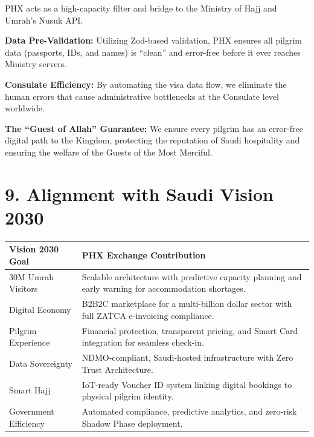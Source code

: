 \documentclass[11pt,a4paper]{article}
\begin{document}
PHX acts as a high-capacity filter and bridge to the Ministry of Hajj and Umrah's Nusuk API.


\vspace{0.3cm}

\textbf{Data Pre-Validation:} Utilizing Zod-based validation, PHX ensures all pilgrim data (passports, IDs, and names) is ``clean'' and error-free before it ever reaches Ministry servers.

\vspace{0.3cm}

\textbf{Consulate Efficiency:} By automating the visa data flow, we eliminate the human errors that cause administrative bottlenecks at the Consulate level worldwide.

\vspace{0.3cm}

\textbf{The ``Guest of Allah'' Guarantee:} We ensure every pilgrim has an error-free digital path to the Kingdom, protecting the reputation of Saudi hospitality and ensuring the welfare of the Guests of the Most Merciful.

\section*{9. Alignment with Saudi Vision 2030}

\begin{center}
\begin{tabular}{|>{\raggedright\arraybackslash}p{4cm}|>{\raggedright\arraybackslash}p{10cm}|}
\hline
\rowcolor{headergray}
\textbf{Vision 2030 Goal} & \textbf{PHX Exchange Contribution} \\
\hline
30M Umrah Visitors & Scalable architecture with predictive capacity planning and early warning for accommodation shortages. \\
\hline
Digital Economy & B2B2C marketplace for a multi-billion dollar sector with full ZATCA e-invoicing compliance. \\
\hline
Pilgrim Experience & Financial protection, transparent pricing, and Smart Card integration for seamless check-in. \\
\hline
Data Sovereignty & NDMO-compliant, Saudi-hosted infrastructure with Zero Trust Architecture. \\
\hline
Smart Hajj & IoT-ready Voucher ID system linking digital bookings to physical pilgrim identity. \\
\hline
Government Efficiency & Automated compliance, predictive analytics, and zero-risk Shadow Phase deployment. \\
\hline
\end{tabular}
\end{center}
\end{document}
